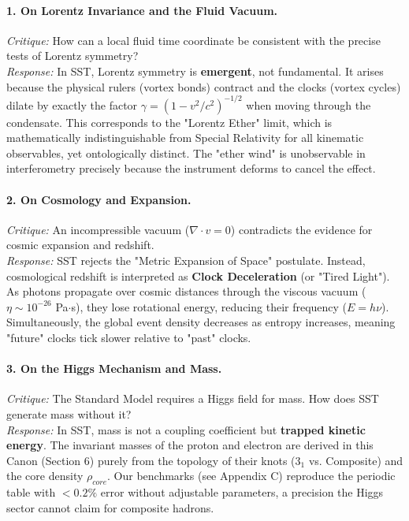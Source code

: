 \documentclass[10pt]{article}
\newcommand{\rhocore}{\rho_{core}}
\begin{document}
\paragraph{1. On Lorentz Invariance and the Fluid Vacuum.}
\textit{Critique:} How can a local fluid time coordinate be consistent with the precise tests of Lorentz symmetry? \\
\textit{Response:} In SST, Lorentz symmetry is \textbf{emergent}, not fundamental. It arises because the physical rulers (vortex bonds) contract and the clocks (vortex cycles) dilate by exactly the factor $\gamma = (1-v^2/c^2)^{-1/2}$ when moving through the condensate. This corresponds to the "Lorentz Ether" limit, which is mathematically indistinguishable from Special Relativity for all kinematic observables, yet ontologically distinct. The "ether wind" is unobservable in interferometry precisely because the instrument deforms to cancel the effect.

\paragraph{2. On Cosmology and Expansion.}
\textit{Critique:} An incompressible vacuum ($\nabla \cdot v = 0$) contradicts the evidence for cosmic expansion and redshift. \\
\textit{Response:} SST rejects the "Metric Expansion of Space" postulate. Instead, cosmological redshift is interpreted as \textbf{Clock Deceleration} (or "Tired Light"). As photons propagate over cosmic distances through the viscous vacuum ($\eta \sim 10^{-26}$ Pa$\cdot$s), they lose rotational energy, reducing their frequency ($E=h\nu$). Simultaneously, the global event density decreases as entropy increases, meaning "future" clocks tick slower relative to "past" clocks.

\paragraph{3. On the Higgs Mechanism and Mass.}
\textit{Critique:} The Standard Model requires a Higgs field for mass. How does SST generate mass without it? \\
\textit{Response:} In SST, mass is not a coupling coefficient but \textbf{trapped kinetic energy}. The invariant masses of the proton and electron are derived in this Canon (Section 6) purely from the topology of their knots ($3_1$ vs. Composite) and the core density $\rhocore$. Our benchmarks (see Appendix C) reproduce the periodic table with $<0.2\%$ error without adjustable parameters, a precision the Higgs sector cannot claim for composite hadrons.
\end{document}
